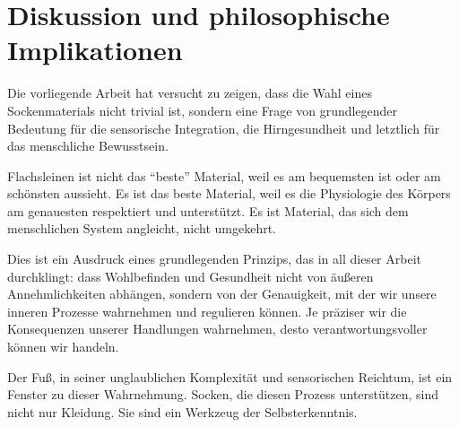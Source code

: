 \documentclass[a4paper,12pt]{article}
\theoremstyle{definition}
\begin{document}
\section{Diskussion und philosophische Implikationen}

Die vorliegende Arbeit hat versucht zu zeigen, dass die Wahl eines Sockenmaterials nicht trivial ist, sondern eine Frage von grundlegender Bedeutung für die sensorische Integration, die Hirngesundheit und letztlich für das menschliche Bewusstsein.

Flachsleinen ist nicht das ``beste'' Material, weil es am bequemsten ist oder am schönsten aussieht. Es ist das beste Material, weil es die Physiologie des Körpers am genauesten respektiert und unterstützt. Es ist Material, das sich dem menschlichen System angleicht, nicht umgekehrt.

Dies ist ein Ausdruck eines grundlegenden Prinzips, das in all dieser Arbeit durchklingt: dass Wohlbefinden und Gesundheit nicht von äußeren Annehmlichkeiten abhängen, sondern von der Genauigkeit, mit der wir unsere inneren Prozesse wahrnehmen und regulieren können. Je präziser wir die Konsequenzen unserer Handlungen wahrnehmen, desto verantwortungsvoller können wir handeln.

Der Fuß, in seiner unglaublichen Komplexität und sensorischen Reichtum, ist ein Fenster zu dieser Wahrnehmung. Socken, die diesen Prozess unterstützen, sind nicht nur Kleidung. Sie sind ein Werkzeug der Selbsterkenntnis.
\end{document}
